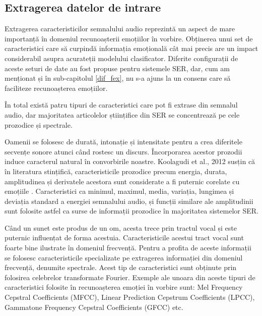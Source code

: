 \documentclass[a4paper,12pt]{book}
\begin{document}
					\subsection{Extragerea datelor de intrare}
						Extragerea caracteristicilor semnalului audio reprezintă un aspect de mare importanță în domeniul recunoașterii emoțiilor în vorbire. Obținerea unui set de caracteristici care să  curpindă informația emoțională cât mai precis are un impact considerabil asupra acurateții modelului clasificator. Diferite configurații de aceste seturi de date au fost propuse pentru sistemele SER, dar, cum am menționat și în sub-capitolul \ref{dif_fex}, nu s-a ajuns la un consens care să faciliteze recunoașterea emoțiilor. \par 
						
						În total există patru tipuri de caracteristici care pot fi extrase din semnalul audio, dar majoritatea articolelor științifice din SER se concentrează pe cele prozodice și spectrale.\par 
						
						Oamenii se folosesc de durată, intonație și intensitate pentru a crea diferitele secvențe sonore atunci când rostesc un discurs. Încorporarea acestor prozodii induce caracterul natural în convorbirile noastre. Koolagudi et al., 2012 \cite{koolagudi} susțin că în literatura stințifică, caracteristicile prozodice precum energia, durata, amplitudinea și derivatele acestora sunt considerate a fi puternic corelate cu emoțiile \cite{dellaert,hcf2,hcf3}. Caracteristici ca minimul, maximul, media, variația, lungimea și deviația standard a energiei semnalului audio, și funcții similare ale amplitudinii sunt folosite astfel ca surse de informații prozodice în majoritatea sistemelor SER. \par 
						
						Când un sunet este produs de un om, acesta trece prin tractul vocal și este puternic influențat de forma acestuia. Caracteristicile acestui tract vocal sunt foarte bine ilustrate în domeniul frecvență. Pentru a profita de aceste informații se folosesc caracteristicile specializate pe extragerea informației din domeniul frecvență, denumite spectrale. Acest tip de caracteristici sunt obținute prin folosirea celebrelor transformate Fourier. Exemple ale unoara din aceste tipuri de caracteristici folosite în recunoașterea emoției în vorbire sunt: Mel Frequency Cepstral Coefficients (MFCC), Linear Prediction Cepstrum Coefficients (LPCC), Gammatone Frequency Cepstral Coefficients (GFCC) etc. \par 
						
\end{document}
